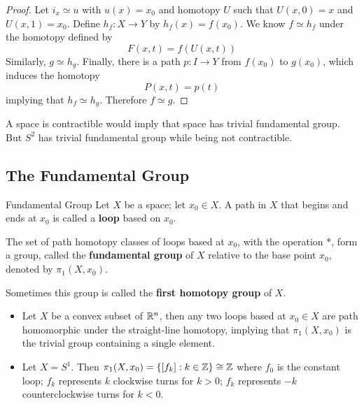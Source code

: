 \documentclass[12pt,a4paper]{article}
\begin{document}
\begin{ex}
\begin{itemize}
            \begin{proof}
                Let $i_x\simeq u$ with $u(x)=x_0$ and homotopy $U$ such that $U(x,0)=x$ and $U(x,1)=x_0$. Define $h_f:X\to Y$ by $h_f(x)=f(x_0)$. We know $f\simeq h_f$ under the homotopy defined by
                \[
                    F(x,t)=f(U(x,t))
                \]
                Similarly, $g\simeq h_g$. Finally, there is a path $p:I\to Y$ from $f(x_0)$ to $g(x_0)$, which induces the homotopy 
                \[
                    P(x,t)=p(t)
                \]
                implying that $h_f\simeq h_g$. Therefore $f\simeq g$.
            \end{proof}
        \end{itemize}
    \end{ex}
    \begin{remark}
        A space is contractible would imply that space has trivial fundamental group. But $S^2$ has trivial fundamental group while being not contractible. 
    \end{remark}
    \bigskip

    \subsection{The Fundamental Group}
    \begin{defi}{Fundamental Group}
        Let $X$ be a space; let $x_0\in X$. A path in $X$ that begins and ends at $x_0$ is called a \textbf{loop} based on $x_0$.

        The set of path homotopy classes of loops based at $x_0$, with the operation $*$, form a group, called the \textbf{fundamental group} of $X$ relative to the base point $x_0$, denoted by $\pi_1(X,x_0)$.
    \end{defi}
    \begin{remark}
        Sometimes this group is called the \textbf{first homotopy group} of $X$.
    \end{remark}
    \bigskip

    \begin{eg}
        \begin{itemize}
            \item Let $X$ be a convex subset of $\mathbb{R}^n$, then any two loops based at $x_0\in X$ are path homomorphic under the straight-line homotopy, implying that $\pi_1(X,x_0)$ is the trivial group containing a single element.
            \item Let $X=S^1$. Then $\pi_1(X,x_0)=\left\{ [f_k]:k\in\mathbb{Z} \right\}\cong\mathbb{Z}$ where $f_0$ is the constant loop; $f_k$ represents $k$ clockwise turns for $k>0$; $f_k$ represents $-k$ counterclockwise turns for $k<0$. 
        \end{itemize}
    \end{eg}
    \bigskip
\end{document}
